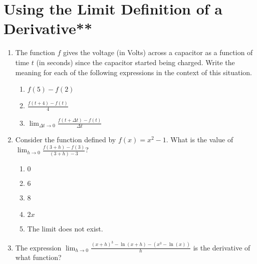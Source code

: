 \documentclass[12pt]{report}
\begin{document}
\newcommand{\less}{\textless}
\newcommand{\greater}{\textgreater}
\newcommand{\reals}{\mathbb{R}}
\newcommand{\integers}{\mathbb{Z}}
\newcommand{\rationals}{\mathbb{Q}}
\newcommand{\dsp}{\displaystyle}



\section{Using the Limit Definition of a Derivative**}

\begin{enumerate}

\item The function $f$ gives the voltage (in Volts) across a capacitor as a function of time $t$ (in seconds) since the capacitor started being charged. Write the meaning for each of the following expressions in the context of this situation.

\begin{enumerate}

\item $f(5)-f(2)$

\item $\frac{f(t+4)-f(t)}{4}$

\item $\lim_{\Delta t\rightarrow 0}\frac{f(t+\Delta t)-f(t)}{\Delta t}$

\end{enumerate}

\item Consider the function defined by $f(x) = x^2 - 1$. What is the value of $ \lim_{h \to 0}\frac{f(3+h)-f(3)}{(3+h)-3}$?

\begin{enumerate}

\item $0$

\item $6$

\item 8

\item $2x$

\item The limit does not exist.

\end{enumerate}

\item The expression $\lim_{h \to 0}\frac{(x+h)^3-\ln(x+h) - \left(x^3-\ln(x)\right)}{h}$ is the derivative of what function?


\end{enumerate}
\end{document}
